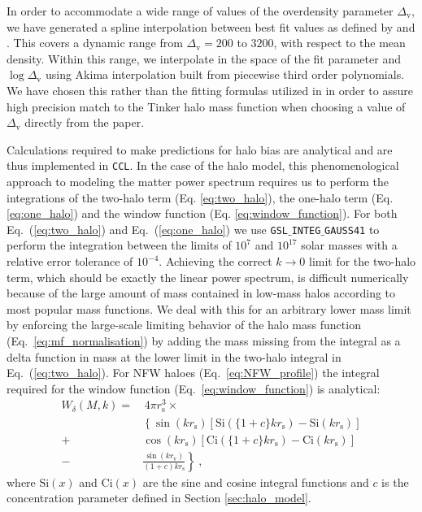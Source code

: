 \documentclass[\docopts]{\docclass}
\newcommand{\ccl}{{\tt CCL}\xspace}
\begin{document}
In order to accommodate a wide range of values of the overdensity parameter $\Delta_\mathrm{v}$, we have generated a spline interpolation between best fit values as defined by \citet{Tinker2008} and \citet{Tinker2010}. This covers a dynamic range from $\Delta_\mathrm{v}=200$ to $3200$, with respect to the mean density. Within this range, we interpolate in the space of the fit parameter and $\log\Delta_\mathrm{v}$ using Akima interpolation built from piecewise third order polynomials. We have chosen this rather than the fitting formulas utilized in \citet{Tinker2010} in order to assure high precision match to the Tinker halo mass function when choosing a value of $\Delta_\mathrm{v}$ directly from the paper. 

Calculations required to make predictions for halo bias are analytical and are thus implemented in \ccl. In the case of the halo model, this phenomenological approach to modeling the matter power spectrum requires us to perform the integrations of the two-halo term (Eq. \ref{eq:two_halo}), the one-halo term (Eq. \ref{eq:one_halo}) and the window function (Eq. \ref{eq:window_function}). For both Eq.~(\ref{eq:two_halo}) and Eq.~(\ref{eq:one_halo}) we use {\tt GSL$\_$INTEG$\_$GAUSS41} to perform the integration between the limits of $10^{7}$ and $10^{17}$ solar masses with a relative error tolerance of $10^{-4}$. Achieving the correct $k\to0$ limit for the two-halo term, which should be exactly the linear power spectrum, is difficult numerically because of the large amount of mass contained in low-mass halos according to most popular mass functions. We deal with this for an arbitrary lower mass limit by enforcing the large-scale limiting behavior of the halo mass function (Eq.~\ref{eq:mf_normalisation}) by adding the mass missing from the integral as a delta function in mass at the lower limit in the two-halo integral in Eq.~(\ref{eq:two_halo}). For NFW haloes (Eq.~\ref{eq:NFW_profile}) the integral required for the window function (Eq.~\ref{eq:window_function}) is analytical:
\begin{equation}
\begin{split}
W_\delta(M,k) = &\, 4\pi r_\mathrm{s}^3 \times \\
& \left\{\sin(kr_\mathrm{s})\left[\mathrm{Si}(\{1+c\}kr_\mathrm{s})-\mathrm{Si}(kr_\mathrm{s})\right]\right. \\
+ & \cos(kr_\mathrm{s})\left[\mathrm{Ci}(\{1+c\}kr_\mathrm{s})-\mathrm{Ci}(kr_\mathrm{s})\right] \\
- & \left.\frac{\sin(kr_\mathrm{v})}{(1+c)kr_\mathrm{s}}\right\}\ ,
\label{eq:NFW_Fourier}
\end{split}
\end{equation}
where $\mathrm{Si}(x)$ and $\mathrm{Ci}(x)$ are the sine and cosine integral functions and $c$ is the concentration parameter defined in Section \ref{sec:halo_model}.
\end{document}
